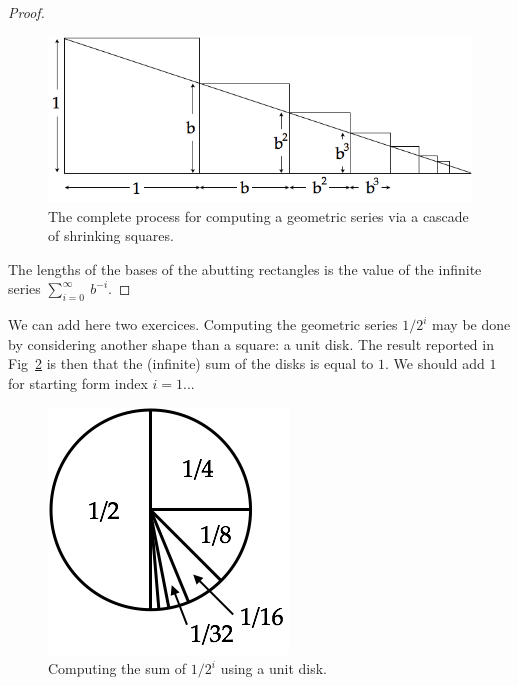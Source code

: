 \begin{proof}
\begin{figure}[ht]
\begin{center}
       \includegraphics[scale=0.4]{FiguresMaths/SumGeometricGeneral3}
\caption{The complete process for computing a geometric series via a
  cascade of shrinking squares.}
       \label{fig:sumGeoGeneral3}
\end{center}
\end{figure}
The lengths of the bases of the abutting rectangles is the value of
the infinite series $\displaystyle \sum_{i=0}^\infty \ b^{-i}$.
\end{proof}

\medskip
{\Denis We can add here two exercices.}
Computing the geometric series $1/2^i$ may be done by considering another shape than a square:
a unit disk. The result reported in Fig~\ref{fig:sumGeo1sur2circle} is then that the (infinite) sum of the disks is equal to $1$. 
We should add $1$ for starting form index $i=1$...
\begin{figure}[ht]
\begin{center}
       \includegraphics[scale=0.5]{FiguresMaths/SumGeometric1sur2circle}
\caption{Computing the sum of $1/2^i$ using a unit disk.}
       \label{fig:sumGeo1sur2circle}
\end{center}
\end{figure}

